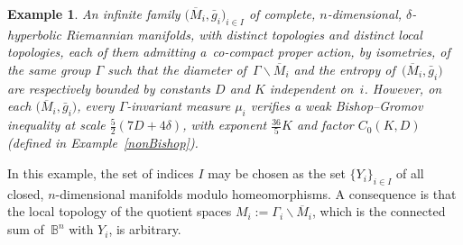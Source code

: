 \documentclass[pdftex]{sigma}
\numberwithin{equation}{section}
\newtheorem{exa}[theor]{Example}
\begin{document}
\begin{exa}\label{infinitetopologies} An infinite family $\big(\overline M_i, \bar g_i\big)_{i \in I}$ of complete, $n$-dimensional, $\delta$-hyperbolic Riemannian
manifolds, with distinct topologies and distinct local topologies, each of them admitting a~co-compact proper action, by isometries, of the same group
$\Gamma$ such that the diameter of~$ \Gamma \backslash \overline M_i$ and
the entropy of~$\big(\overline M_i, \bar g_i\big)$ are respectively bounded by constants
$D$ and $K$ independent on~$i$. However, on each $\big(\overline M_i, \bar g_i\big)$, every $\Gamma$-invariant measure $\mu_i$ verifies a weak Bishop--Gromov
inequa\-lity at scale $\frac{5}{2} (7 D + 4 \delta)$, with exponent $\frac{36}{5} K$ and factor $C_0 (K, D)$ (defined in Example~\ref{nonBishop}).
\end{exa}

In this example, the set of indices $I$ may be chosen as the set $\{Y_i\}_{i \in I}$ of all closed, $n$-dimensional manifolds modulo homeomorphisms. A
 consequence is that the local topology of the quotient spaces $M_i := \Gamma_i \backslash \overline M_i$, which is the connected sum of~$\mathbb B^n$ with $Y_i$, is arbitrary.
\end{document}
